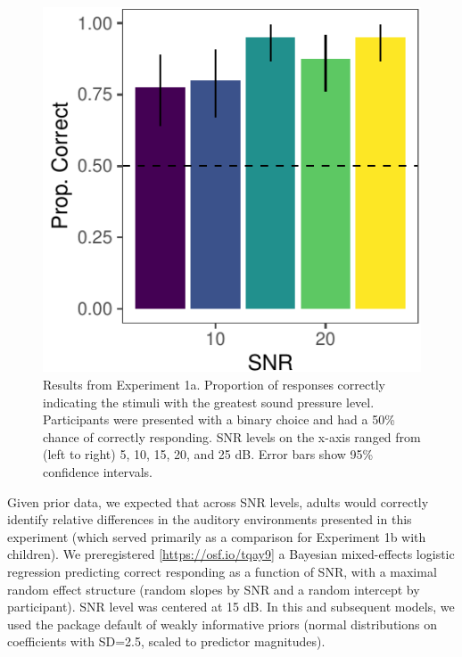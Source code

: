 \documentclass[10pt, letterpaper]{article}
\newenvironment{CodeChunk}{}{}
\begin{document}
\begin{CodeChunk}
\begin{figure}[t]

{\centering \includegraphics{figs/e1a-bar-1} 

}

\caption[Results from Experiment 1a]{Results from Experiment 1a. Proportion of responses correctly indicating the stimuli with the greatest sound pressure level. Participants were presented with a binary choice and had a 50\% chance of correctly responding. SNR levels on the x-axis ranged from (left to right) 5, 10, 15, 20, and 25 dB. Error bars show 95\% confidence intervals.}\label{fig:e1a-bar}
\end{figure}
\end{CodeChunk}

Given prior data, we expected that across SNR levels, adults would
correctly identify relative differences in the auditory environments
presented in this experiment (which served primarily as a comparison for
Experiment 1b with children). We preregistered
{[}\url{https://osf.io/tqay9}{]} a Bayesian mixed-effects logistic
regression predicting correct responding as a function of SNR, with a
maximal random effect structure (random slopes by SNR and a random
intercept by participant). SNR level was centered at 15 dB. In this and
subsequent models, we used the package default of weakly informative
priors (normal distributions on coefficients with SD=2.5, scaled to
predictor magnitudes).
\end{document}
